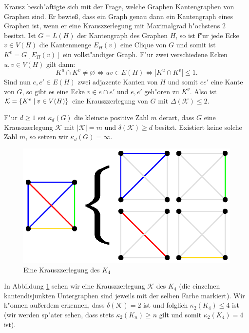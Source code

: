 Krausz \cite{Krausz43} besch"aftigte sich mit der Frage, welche Graphen Kantengraphen von Graphen sind. Er bewie{\ss}, dass ein Graph genau dann ein Kantengraph eines Graphen ist, wenn er eine Krauszzerlegung mit Maximalgrad h"ochstens $2$ besitzt. Ist $G=L(H)$ der Kantengraph des Graphen $H$, so ist f"ur jede Ecke $v\in V(H)$ die Kantenmenge $E_H(v)$ eine Clique von $G$ und somit ist $K^{v}=G[E_H(v)]$ ein vollst"andiger Graph. F"ur zwei verschiedene Ecken $u,v\in V(H)$ gilt dann:
$$K^{u}\cap K^{v} \neq \varnothing \Leftrightarrow uv \in E(H) \Leftrightarrow |K^{u} \cap K^{v}| \leq 1.$$
Sind nun $e,e'\in E(H)$ zwei adjazente Kanten von $H$ und somit $ee'$ eine Kante von $G$, so gibt es eine Ecke $v\in e\cap e'$ und $e,e'$ geh"oren zu $K^{v}$. Also ist $\mathcal{K} = \{K^{v} \;|\; v\in V(H) \}$ eine Krauszzerlegung von $G$ mit $\Delta(\mathcal{K}) \leq 2$.

F"ur $d \geq 1$ sei $\kappa_d(G)$ die kleinste positive Zahl $m$ derart, dass $G$ eine Krauszzerlegung $\mathcal K$ mit $|\mathcal K| = m$ und $\delta(\mathcal K) \geq d$ besitzt. Existiert keine solche Zahl $m$, so setzen wir $\kappa_{d}(G) = \infty$.

\begin{figure}[htb]
  \centering
  \includegraphics{images/k4decomp.eps}
  \caption{Eine Krauszzerlegung des $K_4$}
  \label{fig:KrauszzerlegungK4}
\end{figure}
In Abbildung \ref{fig:KrauszzerlegungK4} sehen wir eine Krauszzerlegung $\mathcal{K}$ des $K_4$ (die einzelnen kantendisjunkten Untergraphen sind jeweils mit der selben Farbe markiert). Wir k"onnen au{\ss}erdem erkennen, dass $\delta(\mathcal{K}) = 2$ ist und folglich $\kappa_{2}(K_4) \leq 4$ ist (wir werden sp"ater sehen, dass stets $\kappa_{2}(K_n) \geq n$ gilt und somit $\kappa_{2}(K_{4}) = 4$ ist). 

